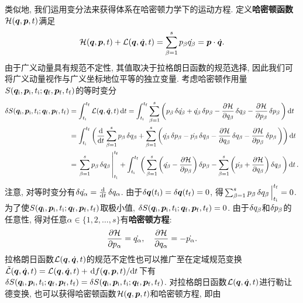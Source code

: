 类似地, 我们运用变分法来获得体系在哈密顿力学下的运动方程. 定义\textbf{哈密顿函数}$ \mathcal{H}(\vb*{q},\vb*{p},t) $满足
\begin{equation}
    \mathcal{H}(\vb*{q},\vb*{p},t) + \mathcal{L}(\vb*{q},\dot{\vb*{q}},t) = \sum_{\beta=1}^s p_{\beta}\dot{q_{\beta}} = \vb*{p} \cdot \dot{\vb*{q}}.
\end{equation}
由于广义动量具有规范不定性, 其值取决于拉格朗日函数的规范选择, 因此我们可将广义动量视作与广义坐标地位平等的独立变量. 考虑哈密顿作用量$ S(\vb*{q}_{\mathrm{i}},\vb*{p}_{\mathrm{i}},t_{\mathrm{i}};\vb*{q}_{\mathrm{f}},\vb*{p}_{\mathrm{f}},t_{\mathrm{f}}) $的等时变分
\begin{align*}
    \var{\action(\vb*{q}_{\init},\vb*{p}_{\init},t_{\init};\vb*{q}_{\fini},\vb*{p}_{\fini},t_{\fini})} &=\int_{t_{\init}}^{t_{\fini}} \lagr(\vb*{q},\dot{\vb*{q}},t) \dd{t} = \int_{t_{\init}}^{t_{\fini}} \sum_{\beta=1}^s\bigg(p_{\beta} \var{\dot{q_{\beta}}} + \dot{q_{\beta}} \var{p_{\beta}} - \pdv{\hami}{q_{\beta}}\var{q_{\beta}} - \pdv{\hami}{p_{\beta}}\var{p_{\beta}}\bigg) \dd{t}\\
    &=\int_{t_{\init}}^{t_{\fini}} \bigg(\dv{t} \sum_{\beta=1}^s p_{\beta} \var{q_{\beta}} +\sum_{\beta=1}^s \bigg(\dot{q_{\beta}} \var{p_{\beta}} - \dot{p_{\beta}} \var{q_{\beta}} - \pdv{\hami}{q_{\beta}}\var{q_{\beta}} - \pdv{\hami}{p_{\beta}}\var{p_{\beta}} \bigg)\bigg) \dd{t}\\
    &=\eval{\sum_{\beta=1}^s p_{\beta} \var{q_{\beta}}}_{t_{\init}}^{t_{\fini}} + \int_{t_{\init}}^{t_{\fini}} \bigg(\sum_{\beta=1}^s \bigg(\dot{q_{\beta}} - \pdv{\hami}{p_{\beta}} \bigg)\var{p_{\beta}} - \sum_{\beta=1}^s \bigg(\dot{p_{\beta}} + \pdv{\hami}{q_{\beta}} \bigg)\var{q_{\beta}} \bigg) \dd{t}.
\end{align*}
注意, 对等时变分有$ \var{\dot{q_{\alpha}}} = \dv{t} \var{q_{\alpha}} $. 由于$ \var{\vb*{q}(t_{\mathrm{i}})}=\var{\vb*{q}(t_{\mathrm{f}})}=0 $, 得$ \eval{\sum_{\beta=1}^s p_{\beta} \var{q_{\beta}}}_{t_{\init}}^{t_{\fini}}=0 $. 为了使$ S(\vb*{q}_{\mathrm{i}},\vb*{p}_{\mathrm{i}},t_{\mathrm{i}};\vb*{q}_{\mathrm{f}},\vb*{p}_{\mathrm{f}},t_{\mathrm{f}}) $取极小值, $ \var{S(\vb*{q}_{\mathrm{i}},\vb*{p}_{\mathrm{i}},t_{\mathrm{i}};\vb*{q}_{\mathrm{f}},\vb*{p}_{\mathrm{f}},t_{\mathrm{f}})}=0 $. 由于$ \var{q_{\beta}} $和$ \var{p_{\beta}} $的任意性, 得对任意$ \alpha \in \{1,2,\ldots,s\} $有\textbf{哈密顿方程}:
\begin{equation}
    \pdv{\mathcal{H}}{p_{\alpha}} = \dot{q_{\alpha}}, \quad \pdv{\mathcal{H}}{q_{\alpha}} = -\dot{p_{\alpha}}.
\end{equation}
拉格朗日函数$ \mathcal{L}(\vb*{q},\dot{\vb*{q}},t) $的规范不定性也可以推广至在定域规范变换$ \tilde{\mathcal{L}}(\vb*{q},\dot{\vb*{q}},t)=\mathcal{L}(\vb*{q},\dot{\vb*{q}},t)+\dv*{f(\vb*{q},\vb*{p},t)}{t} $下有$ \var{S(\vb*{q}_{\mathrm{i}},\vb*{p}_{\mathrm{i}},t_{\mathrm{i}};\vb*{q}_{\mathrm{f}},\vb*{p}_{\mathrm{f}},t_{\mathrm{f}})}=\var{S(\vb*{q}_{\mathrm{i}},\vb*{p}_{\mathrm{i}},t_{\mathrm{i}};\vb*{q}_{\mathrm{f}},\vb*{p}_{\mathrm{f}},t_{\mathrm{f}})} $. 对拉格朗日函数$ \mathcal{L}(\vb*{q},\dot{\vb*{q}},t) $进行勒让德变换, 也可以获得哈密顿函数$ \mathcal{H}(\vb*{q},\vb*{p},t) $和哈密顿方程, 即由
